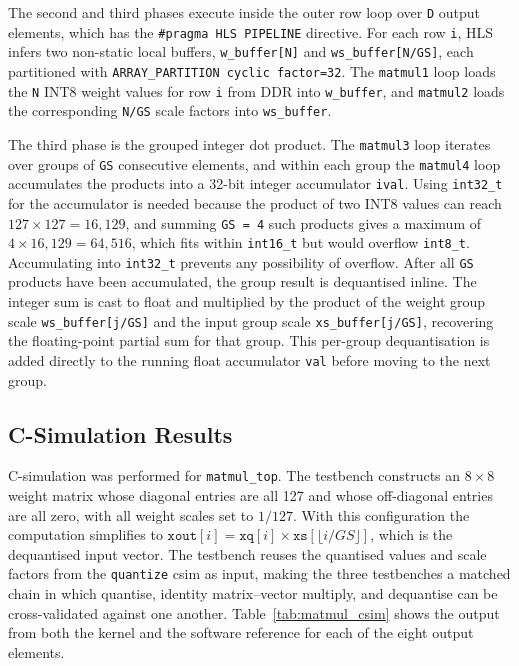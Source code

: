 The second and third phases execute inside the outer row loop over
\texttt{D} output elements, which has the \texttt{\#pragma HLS
PIPELINE} directive. For each row \texttt{i}, HLS infers two
non-static local buffers, \texttt{w\_buffer[N]} and
\texttt{ws\_buffer[N/GS]}, each partitioned with \texttt{ARRAY\_PARTITION
cyclic factor=32}. The \texttt{matmul1} loop loads the \texttt{N} INT8
weight values for row \texttt{i} from DDR into \texttt{w\_buffer}, and
\texttt{matmul2} loads the corresponding \texttt{N/GS} scale factors into
\texttt{ws\_buffer}.

The third phase is the grouped integer dot product. The \texttt{matmul3}
loop iterates over groups of \texttt{GS} consecutive elements, and within
each group the \texttt{matmul4} loop accumulates the products
into a 32-bit integer accumulator \texttt{ival}. Using \texttt{int32\_t}
for the accumulator is needed because the product of two INT8 values can reach
$127 \times 127 = 16{,}129$, and summing \texttt{GS = 4} such products
gives a maximum of $4 \times 16{,}129 = 64{,}516$, which fits within
\texttt{int16\_t} but would overflow \texttt{int8\_t}. Accumulating into
\texttt{int32\_t} prevents any possibility of overflow. After all
\texttt{GS} products have been accumulated, the group result is
dequantised inline. The integer sum is cast to float and multiplied by the
product of the weight group scale \texttt{ws\_buffer[j/GS]} and the input
group scale \texttt{xs\_buffer[j/GS]}, recovering the floating-point
partial sum for that group. This per-group dequantisation is added
directly to the running float accumulator \texttt{val} before moving to
the next group.

\subsection{C-Simulation Results}
\label{subsec:matmul_csim}

C-simulation was performed for \texttt{matmul\_top}. The testbench
constructs an $8 \times 8$ weight matrix whose diagonal entries are all
127 and whose off-diagonal entries are all zero, with all weight scales
set to $1/127$. With this configuration the computation simplifies to
$\texttt{xout}[i] = \texttt{xq}[i] \times \texttt{xs}[\lfloor i/GS
\rfloor]$, which is the dequantised input vector. The testbench
reuses the quantised values and scale factors from the \texttt{quantize}
csim as input, making the three testbenches a matched chain in which
quantise, identity matrix--vector multiply, and dequantise can be
cross-validated against one another. Table~\ref{tab:matmul_csim} shows the output from both the kernel and the
software reference for each of the eight output elements.

